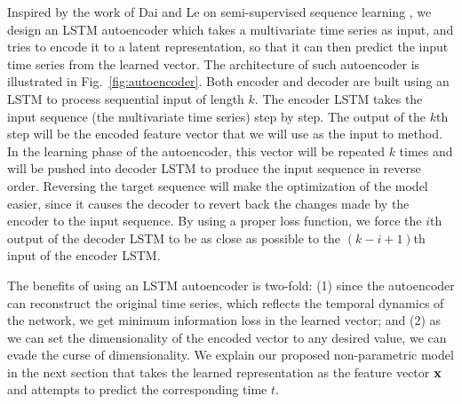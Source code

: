 Inspired by the work of Dai and Le on semi-supervised sequence learning \cite{dai2015semi}, we design an LSTM autoencoder which takes a multivariate time series as input, and tries to encode it to a latent representation, so that it can then predict the input time series from the learned vector. The architecture of such autoencoder is illustrated in Fig.~\ref{fig:autoencoder}. Both encoder and decoder are built using an LSTM to process sequential input of length $k$. The encoder LSTM takes the input sequence (the multivariate time series) step by step. The output of the $k$th step will be the encoded feature vector that we will use as the input to \npglm method. In the learning phase of the autoencoder, this vector will be repeated $k$ times and will be pushed into decoder LSTM to produce the input sequence in reverse order. Reversing the target sequence will make the optimization of the model easier, since it causes the decoder to revert back the changes made by the encoder to the input sequence. By using a proper loss function, we force the $i$th output of the decoder LSTM to be as close as possible to the $(k-i+1)$th input of the encoder LSTM.

The benefits of using an LSTM autoencoder is two-fold: (1) since the autoencoder can reconstruct the original time series, which reflects the temporal dynamics of the network, we get minimum information loss in the learned vector; and (2) as we can set the dimensionality of the encoded vector to any desired value, we can evade the curse of dimensionality. We explain our proposed non-parametric model in the next section that takes the learned representation as the feature vector $\mathbf{x}$ and attempts to predict the corresponding time $t$. 


